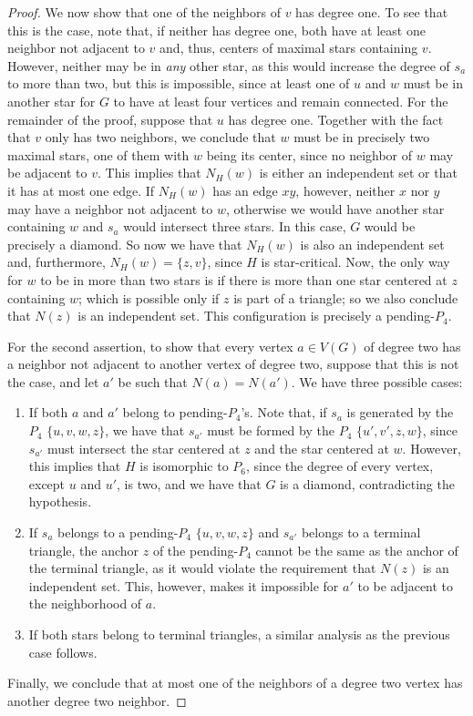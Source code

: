 \begin{proof}
   We now show that one of the neighbors of $v$ has degree one.
   To see that this is the case, note that, if neither has degree one, both have at least one neighbor not adjacent to $v$ and, thus, centers of maximal stars containing $v$.
   However, neither may be in \textit{any} other star, as this would increase the degree of $s_a$ to more than two, but this is impossible, since at least one of $u$ and $w$ must be in another star for $G$ to have at least four vertices and remain connected.
   For the remainder of the proof, suppose that $u$ has degree one.
   Together with the fact that $v$ only has two neighbors, we conclude that $w$ must be in precisely two maximal stars, one of them with $w$ being its center, since no neighbor of $w$ may be adjacent to $v$.
   This implies that $N_H(w)$ is either an independent set or that it has at most one edge.
   If $N_H(w)$ has an edge $xy$, however, neither $x$ nor $y$ may have a neighbor not adjacent to $w$, otherwise we would have another star containing $w$ and $s_a$ would intersect three stars.
   In this case, $G$ would be precisely a diamond.
   So now we have that $N_H(w)$ is also an independent set and, furthermore, $N_H(w) = \{z, v\}$, since $H$ is star-critical.
   Now, the only way for $w$ to be in more than two stars is if there is more than one star centered at $z$ containing $w$; which is possible only if $z$ is part of a triangle; so we also conclude that $N(z)$ is an independent set.
   This configuration is precisely a pending-$P_4$.
   
   For the second assertion, to show that every vertex $a \in V(G)$ of degree two has a neighbor not adjacent to another vertex of degree two, suppose that this is not the case, and let $a'$ be such that $N(a) = N(a')$.
   We have three possible cases:
   \begin{enumerate}\addtocounter{enumi}{5}
       \item If both $a$ and $a'$ belong to pending-$P_4$'s. Note that, if $s_a$ is generated by the $P_4$ $\{u,v,w,z\}$, we have that $s_{a'}$ must be formed by the $P_4$ $\{u',v', z, w\}$, since $s_{a'}$ must intersect the star centered at $z$ and the star centered at $w$.
       However, this implies that $H$ is isomorphic to $P_6$, since the degree of every vertex, except $u$ and $u'$, is two, and we have that $G$ is a diamond, contradicting the hypothesis.
       \item If $s_a$ belongs to a pending-$P_4$ $\{u,v,w,z\}$ and $s_{a'}$ belongs to a terminal triangle, the anchor $z$ of the pending-$P_4$ cannot be the same as the anchor of the terminal triangle, as it would violate the requirement that $N(z)$ is an independent set.
       This, however, makes it impossible for $a'$ to be adjacent to the neighborhood of $a$.
       \item If both stars belong to terminal triangles, a similar analysis as the previous case follows.
   \end{enumerate}
   Finally, we conclude that at most one of the neighbors of a degree two vertex has another degree two neighbor.
\end{proof}

